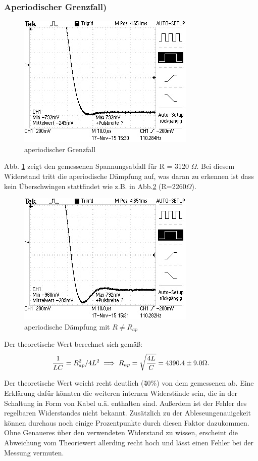 \subsubsection{Aperiodischer Grenzfall)}
\begin{figure}
  \centering
  \includegraphics{data/F0001TEK.jpg}
  \caption{aperiodischer Grenzfall}
  \label{fig:5bergebnis}
\end{figure}

Abb. \ref{fig:5bergebnis} zeigt den gemessenen Spannungsabfall für
R = 3120 $\Omega$.
Bei diesem Widerstand tritt die aperiodische Dämpfung auf, was daran zu erkennen
ist dass kein Überschwingen stattfindet wie z.B. in Abb.\ref{fig:über}
(R=2260$\Omega$).
\begin{figure}
  \centering
  \includegraphics{data/F0002TEK.jpg}
  \caption{aperiodische Dämpfung mit $R \neq R_{ap}$}
  \label{fig:über}
\end{figure}

Der theoretische Wert berechnet sich gemäß:
\begin{equation}
  \frac{1}{LC} = R_{ap}^2/4L^2 \\
  \implies R_{ap} = \sqrt{\frac{4L}{C}} = 4390.4 \pm 9.0\Omega.
\end{equation}

Der theoretische Wert weicht recht deutlich (\~40\%) von dem gemessenen ab.
Eine Erklärung dafür könnten die weiteren internen Widerstände sein, die in
der Schaltung in Form von Kabel u.ä. enthalten sind. Außerdem ist der Fehler
des regelbaren Widerstandes nicht bekannt. Zusätzlich zu der Ableseungenauigekeit
können durchaus noch einige Prozentpunkte durch diesen Faktor dazukommen.
Ohne Genaueres über den verwendeten Widerstand zu wissen, erscheint die
Abweichung vom Theoriewert allerding recht hoch und lässt einen Fehler
bei der Messung vermuten.

